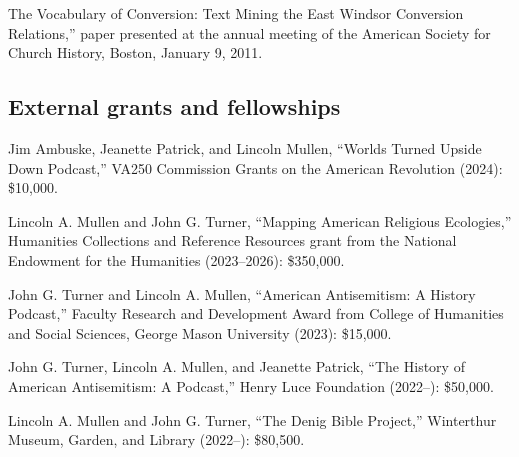 \documentclass[11pt]{article}
\begin{document}
\noindent{}The Vocabulary of Conversion: Text Mining the East Windsor Conversion Relations,'' paper presented at the annual meeting of the American Society for Church History, Boston, January 9, 2011.



% 

\subsection{External grants and fellowships}\label{Grants and fellowships}

Jim Ambuske, Jeanette Patrick, and Lincoln Mullen, ``Worlds Turned Upside 
Down Podcast,'' VA250 Commission Grants on the American Revolution (2024): 
\$10,000.

Lincoln A. Mullen and John G. Turner, ``Mapping American Religious Ecologies,'' 
Humanities Collections and Reference Resources grant from the National Endowment 
for the Humanities (2023--2026): \$350,000.

John G. Turner and Lincoln A. Mullen, ``American Antisemitism: A History 
Podcast,'' Faculty Research and Development Award from College of Humanities and 
Social Sciences, George Mason University (2023): \$15,000.

John G. Turner, Lincoln A. Mullen, and Jeanette Patrick, ``The History of American Antisemitism: A Podcast,'' Henry Luce Foundation (2022--): \$50,000.

Lincoln A. Mullen and John G. Turner, ``The Denig Bible Project,'' Winterthur Museum, Garden, and Library (2022--): \$80,500.
\end{document}
